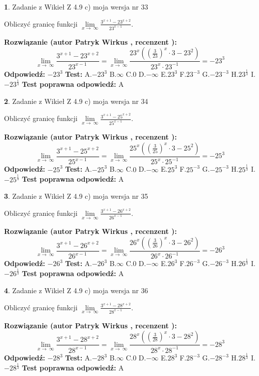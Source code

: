 \documentclass[12pt, a4paper]{article}
\theoremstyle{definition} %
\newtheorem{zad}{}
\newcommand{\zadStart}[1]{\begin{zad}#1\newline}
\newcommand{\zadStop}{\end{zad}}
\newcommand{\rozwStart}[2]{\noindent \textbf{Rozwiązanie (autor #1 , recenzent #2): }\newline}
\newcommand{\rozwStop}{\newline}
\newcommand{\odpStart}{\noindent \textbf{Odpowiedź:}\newline}
\newcommand{\odpStop}{\newline}
\newcommand{\testStart}{\noindent \textbf{Test:}\newline}
\newcommand{\testStop}{\newline}
\newcommand{\kluczStart}{\noindent \textbf{Test poprawna odpowiedź:}\newline}
\newcommand{\kluczStop}{\newline}
\begin{document}
\zadStart{Zadanie z Wikieł Z 4.9 c) moja wersja nr 33}


Obliczyć granicę funkcji  $\lim\limits_{x\to\ \infty}\frac{3^{x+1}-23^{x+2}}{23^{x-1}}$.
\zadStop
\rozwStart{Patryk Wirkus}{}
$$\lim\limits_{x\to\ \infty}\frac{3^{x+1}-23^{x+2}}{23^{x-1}}=\lim\limits_{x\to\ \infty}\frac{23^{x}((\frac{3}{23})^{x}\cdot 3 -23^{2})}{23^{x}\cdot 23^{-1}} = -23^{3}$$
\rozwStop
\odpStart
$-23^{3}$
\odpStop
\testStart
A.$-23^{3}$ B.$\infty$ C.$0$ D.$-\infty$ E.$23^{3}$
F.$23^{-3}$ G.$-23^{-3}$
H.$23^{\frac{1}{3}}$
I.$-23^{\frac{1}{3}}$
\testStop
\kluczStart
A
\kluczStop



\zadStart{Zadanie z Wikieł Z 4.9 c) moja wersja nr 34}


Obliczyć granicę funkcji  $\lim\limits_{x\to\ \infty}\frac{3^{x+1}-25^{x+2}}{25^{x-1}}$.
\zadStop
\rozwStart{Patryk Wirkus}{}
$$\lim\limits_{x\to\ \infty}\frac{3^{x+1}-25^{x+2}}{25^{x-1}}=\lim\limits_{x\to\ \infty}\frac{25^{x}((\frac{3}{25})^{x}\cdot 3 -25^{2})}{25^{x}\cdot 25^{-1}} = -25^{3}$$
\rozwStop
\odpStart
$-25^{3}$
\odpStop
\testStart
A.$-25^{3}$ B.$\infty$ C.$0$ D.$-\infty$ E.$25^{3}$
F.$25^{-3}$ G.$-25^{-3}$
H.$25^{\frac{1}{3}}$
I.$-25^{\frac{1}{3}}$
\testStop
\kluczStart
A
\kluczStop



\zadStart{Zadanie z Wikieł Z 4.9 c) moja wersja nr 35}


Obliczyć granicę funkcji  $\lim\limits_{x\to\ \infty}\frac{3^{x+1}-26^{x+2}}{26^{x-1}}$.
\zadStop
\rozwStart{Patryk Wirkus}{}
$$\lim\limits_{x\to\ \infty}\frac{3^{x+1}-26^{x+2}}{26^{x-1}}=\lim\limits_{x\to\ \infty}\frac{26^{x}((\frac{3}{26})^{x}\cdot 3 -26^{2})}{26^{x}\cdot 26^{-1}} = -26^{3}$$
\rozwStop
\odpStart
$-26^{3}$
\odpStop
\testStart
A.$-26^{3}$ B.$\infty$ C.$0$ D.$-\infty$ E.$26^{3}$
F.$26^{-3}$ G.$-26^{-3}$
H.$26^{\frac{1}{3}}$
I.$-26^{\frac{1}{3}}$
\testStop
\kluczStart
A
\kluczStop



\zadStart{Zadanie z Wikieł Z 4.9 c) moja wersja nr 36}


Obliczyć granicę funkcji  $\lim\limits_{x\to\ \infty}\frac{3^{x+1}-28^{x+2}}{28^{x-1}}$.
\zadStop
\rozwStart{Patryk Wirkus}{}
$$\lim\limits_{x\to\ \infty}\frac{3^{x+1}-28^{x+2}}{28^{x-1}}=\lim\limits_{x\to\ \infty}\frac{28^{x}((\frac{3}{28})^{x}\cdot 3 -28^{2})}{28^{x}\cdot 28^{-1}} = -28^{3}$$
\rozwStop
\odpStart
$-28^{3}$
\odpStop
\testStart
A.$-28^{3}$ B.$\infty$ C.$0$ D.$-\infty$ E.$28^{3}$
F.$28^{-3}$ G.$-28^{-3}$
H.$28^{\frac{1}{3}}$
I.$-28^{\frac{1}{3}}$
\testStop
\kluczStart
A
\kluczStop
\end{document}
